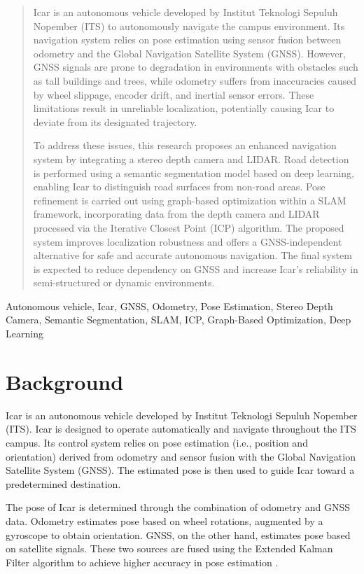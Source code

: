 \documentclass[conference]{IEEEtran}
\begin{document}
\begin{abstract}
	Icar is an autonomous vehicle developed by Institut Teknologi Sepuluh Nopember (ITS) to autonomously navigate the campus environment. Its navigation system relies on pose estimation using sensor fusion between odometry and the Global Navigation Satellite System (GNSS). However, GNSS signals are prone to degradation in environments with obstacles such as tall buildings and trees, while odometry suffers from inaccuracies caused by wheel slippage, encoder drift, and inertial sensor errors. These limitations result in unreliable localization, potentially causing Icar to deviate from its designated trajectory.

	To address these issues, this research proposes an enhanced navigation system by integrating a stereo depth camera and LIDAR. Road detection is performed using a semantic segmentation model based on deep learning, enabling Icar to distinguish road surfaces from non-road areas. Pose refinement is carried out using graph-based optimization within a SLAM framework, incorporating data from the depth camera and LIDAR processed via the Iterative Closest Point (ICP) algorithm. The proposed system improves localization robustness and offers a GNSS-independent alternative for safe and accurate autonomous navigation. The final system is expected to reduce dependency on GNSS and increase Icar's reliability in semi-structured or dynamic environments.
\end{abstract}

\begin{IEEEkeywords}
	Autonomous vehicle, Icar, GNSS, Odometry, Pose Estimation, Stereo Depth Camera, Semantic Segmentation, SLAM, ICP, Graph-Based Optimization, Deep Learning
\end{IEEEkeywords}


\section{Background}
Icar is an autonomous vehicle developed by Institut Teknologi Sepuluh Nopember (ITS). Icar is designed to operate automatically and navigate throughout the ITS campus. Its control system relies on pose estimation (i.e., position and orientation) derived from odometry and sensor fusion with the Global Navigation Satellite System (GNSS). The estimated pose is then used to guide Icar toward a predetermined destination.

\par
The pose of Icar is determined through the combination of odometry and GNSS data. Odometry estimates pose based on wheel rotations, augmented by a gyroscope to obtain orientation. GNSS, on the other hand, estimates pose based on satellite signals. These two sources are fused using the Extended Kalman Filter algorithm to achieve higher accuracy in pose estimation \cite{ref_mas_marin}.
\end{document}
